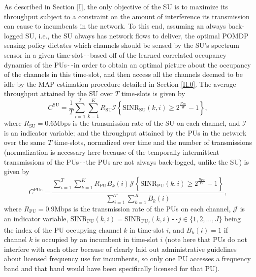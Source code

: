 \documentclass[12pt, draftcls, onecolumn]{IEEEtran}
\begin{document}
As described in Section \ref{I}, the only objective of the SU is to maximize its throughput subject to a constraint on the amount of interference its transmission can cause to incumbents in the network. To this end, assuming an always back-logged SU, i.e., the SU always has network flows to deliver, the optimal POMDP sensing policy dictates which channels should be sensed by the SU's spectrum sensor in a given time-slot\texttt{-{}-}based off of the learned correlated occupancy dynamics of the PUs\texttt{-{}-}in order to obtain an optimal picture about the occupancy of the channels in this time-slot, and then access all the channels deemed to be idle by the MAP estimation procedure detailed in Section \ref{II.0}. The average throughput attained by the SU over $T$ time-slots is given by
\begin{equation}\label{30}
    C^{\text{SU}}=\frac{1}{T}\sum_{i=1}^{T}\sum_{k=1}^{K}R_{\text{SU}}\mathcal{I}\left\{\text{SINR}_{\text{SU}}(k,i) \geq 2^{\frac{R_{\text{SU}}}{W}}-1\right\},
\end{equation}
where $R_{\text{SU}}{=}0.6$Mbps is the transmission rate of the SU on each channel, and $\mathcal{I}$ is an indicator variable; and the throughput attained by the PUs in the network over the same $T$ time-slots, normalized over time and the number of transmissions (normalization is necessary here because of the temporally intermittent transmissions of the PUs\texttt{-{}-}the PUs are not always back-logged, unlike the SU) is given by
\begin{equation}\label{31}
    C^{\text{PUs}}=\frac{\sum_{i=1}^{T}\sum_{k=1}^{K}R_{\text{PU}}B_{k}(i)\mathcal{J}\left\{\text{SINR}_{\text{PU}}(k,i) \geq 2^{\frac{R_{\text{PU}}}{W}}-1\right\}}{\sum_{i=1}^{T}\sum_{k=1}^{K}B_{k}(i)},
\end{equation}
where $R_{\text{PU}}{=}0.9$Mbps is the transmission rate of the PUs on each channel, $\mathcal{J}$ is an indicator variable, $\text{SINR}_{\text{PU}}(k,i){=}\text{SINR}_{\text{PU}_{j}}(k,i)$\texttt{-{}-}$j{\in}\{1,2,\dots,J\}$ being the index of the PU occupying channel $k$ in time-slot $i$, and $B_{k}(i){=}1$ if channel $k$ is occupied by an incumbent in time-slot $i$ (note here that PUs do not interfere with each other because of clearly laid out administrative guidelines about licensed frequency use for incumbents, so only one PU accesses a frequency band and that band would have been specifically licensed for that PU).
\end{document}
